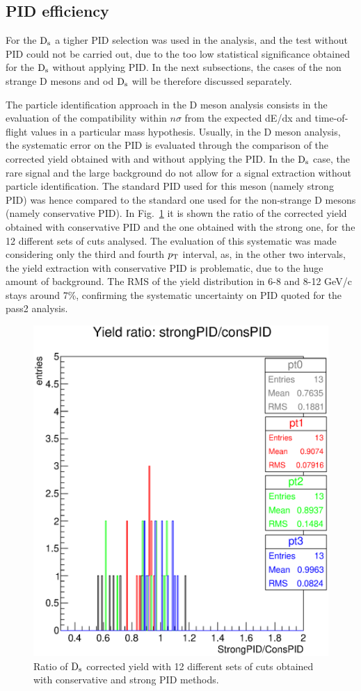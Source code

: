 \subsection{PID efficiency}
For the ${\rm D_s}$ a tigher PID selection was used in the analysis, and the test
without PID could not be carried out, due to the too low statistical 
significance obtained for the ${\rm D_s}$ without applying PID.
In the next subsections, the cases of the non strange D mesons and od ${\rm D_s}$ 
will be therefore discussed separately.

 The particle identification approach in the D meson 
 analysis consists in the evaluation of the compatibility
within $n\sigma$ from the expected dE/dx and time-of-flight 
values in a particular mass hypothesis. Usually,
in the D meson analysis, the systematic error on the PID is 
evaluated through the comparison of the
corrected yield obtained with and without applying the PID.
In the ${\rm D_s}$ case, the rare signal and the large background 
do not allow for a signal extraction without 
particle identification. The standard PID used for this meson 
(namely strong PID) was hence compared to the
standard one used for the non-strange D mesons (namely conservative PID).
 In Fig.~\ref{fig:rmsPID} it is shown the ratio
of the corrected yield obtained with conservative PID and the one 
obtained with the strong one, for the 12 different sets of cuts analysed.
The evaluation of this systematic was made considering only the
 third and fourth $p_{\rm T}$ interval, as, in the other two intervals,
the yield extraction with conservative PID is problematic, due to 
the huge amount of background. The RMS of
the yield distribution in 6-8 and 8-12 GeV/c stays around 7\%, 
confirming the systematic uncertainty on PID quoted for the pass2 analysis.

\begin{figure}[!htb]
\begin{center}
 \includegraphics[width=.45\textwidth]{FigCap4/rms.eps}
\caption{Ratio of ${\rm D_s}$ corrected yield with 12 different sets of
cuts obtained with conservative and strong PID methods.}
\label{fig:rmsPID}
\end{center}
\end{figure}

